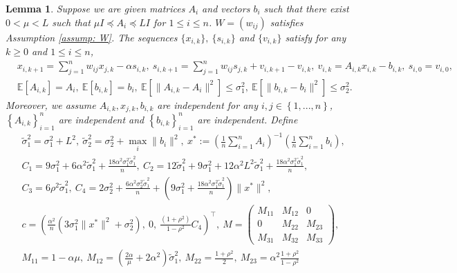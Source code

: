 \documentclass{article}
\theoremstyle{plain}
\newtheorem{lemma}[theorem]{Lemma}
\theoremstyle{definition}
\theoremstyle{remark}
\newcommand{\E}{\mathbb{E}}
\newcommand{\T}{^{\top}}
\begin{document}
\begin{lemma}\label{lem: dsgd_quadratic}
    Suppose we are given matrices $A_i$ and vectors $b_i$ such that there exist $0<\mu<L$ such that $\mu I\preceq A_i\preceq LI$ for $1\leq i\leq n$. $W = (w_{ij})$ satisfies Assumption \ref{assump: W}. The sequences $\{x_{i,k}\},\ \{s_{i,k}\}$ and $\{v_{i,k}\}$ satisfy for any $k\geq 0$ and $1\leq i\leq n$,
    \begin{align*}
        &x_{i,k+1} = \sum_{j=1}^{n}w_{ij}x_{j,k} - \alpha s_{i,k},\ s_{i,k+1} = \sum_{j=1}^{n}w_{ij}s_{j,k} +v_{i,k+1} - v_{i,k},\ v_{i,k} = A_{i,k}x_{i,k} - b_{i,k},\ s_{i,0} = v_{i,0}, \\
        &\E\left[A_{i,k}\right] = A_i,\ \E\left[b_{i,k}\right] = b_i,\ \E\left[\|A_{i,k} - A_i\|^2\right]\leq \sigma_1^2,\ \E\left[\|b_{i,k} - b_i\|^2\right]\leq \sigma_2^2.
    \end{align*}
    Moreover, we assume $A_{i,k}, x_{j,k}, b_{i,k}$ are independent for any $i,j\in\left\{1,...,n\right\}$, $\left\{A_{i,k}\right\}_{i=1}^{n}$ are independent and $\left\{b_{i,k}\right\}_{i=1}^{n}$ are independent. Define
    \begin{align*}
        &\tilde{\sigma}_1^2 = \sigma_1^2 + L^2,\ \tilde{\sigma}_2^2 = \sigma_2^2 + \max_i\|b_i\|^2,\ x^* := \left(\frac{1}{n}\sum_{i=1}^{n}A_i\right)^{-1}\left(\frac{1}{n}\sum_{i=1}^{n}b_i\right), \\
        &C_1 = 9\sigma_1^2 + 6\alpha^2\tilde{\sigma}_1^2 + \frac{18\alpha^2\sigma_1^2\tilde{\sigma}_1^2}{n},\ C_2 = 12\tilde{\sigma}_1^2 + 9\sigma_1^2 + 12\alpha^2L^2\tilde{\sigma}_1^2  + \frac{18\alpha^2\sigma_1^2\tilde{\sigma}_1^2}{n}, \\
        &C_3 = 6\rho^2\tilde{\sigma}_1^2,\ C_4 = 2\sigma_2^2 + \frac{6\alpha^2\sigma_2^2\tilde{\sigma}_1^2}{n} + \left(9\sigma_1^2 + \frac{18\alpha^2\sigma_1^2\tilde{\sigma}_1^2}{n}\right)\|x^*\|^2, \\
        &c = \left(\frac{\alpha^2}{n}(3\sigma_1^2\|x^*\|^2 + \sigma_2^2),\ 0,\ \frac{(1+\rho^2)}{1-\rho^2}C_4\right)\T,\ M = 
        \begin{pmatrix}
            M_{11} &M_{12} &0 \\
            0 &M_{22} &M_{23} \\
            M_{31} &M_{32} &M_{33}
        \end{pmatrix}, \\
        & M_{11} = 1-\alpha\mu,\ M_{12} = \left(\frac{2\alpha}{\mu} + 2\alpha^2\right)\tilde{\sigma}_1^2,\ M_{22} = \frac{1+\rho^2}{2},\ M_{23} = \alpha^2\frac{1+\rho^2}{1-\rho^2} \\

\end{align*}
\end{lemma}
\end{document}

